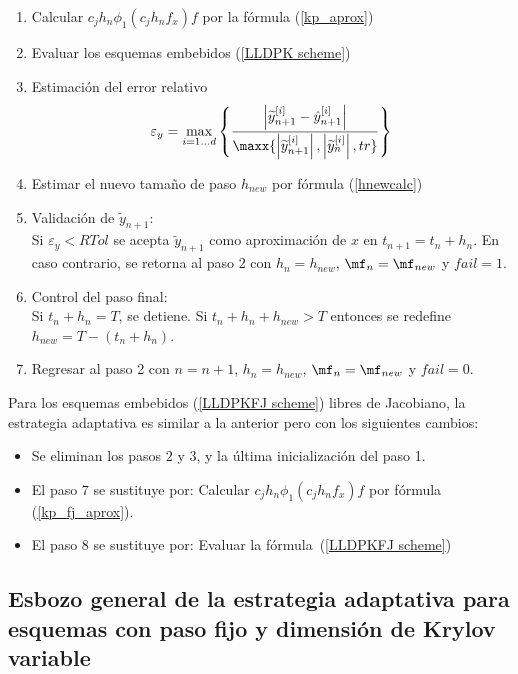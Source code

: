 \begin{enumerate}
    \item Calcular $c_jh_n\phi_1(c_jh_nf_x)f$ por la f\'ormula (\ref{kp_aprox})

    \item Evaluar los esquemas embebidos (\ref{LLDPK scheme})

    \item Estimaci\'on del error relativo
    \[ \varepsilon_y =  \max_{i=1\ldots d}\left\{ \frac{\left\lvert \widetilde{y}^{[i]}_{n+1}-\hat{y}^{[i]}_{n+1} \right\rvert}
    {\maxx{\left\lvert \widetilde{y}^{[i]}_{n+1}  \right\rvert,\left\lvert\widetilde{y}^{[i]}_{n}\right\rvert,tr}} \right\} \]

    \item Estimar el nuevo tama\~no de paso $h_{new}$ por fórmula (\ref{hnewcalc})   

    \item Validaci\'on  de $\widetilde{y}_{n+1}$:\\
    Si $\varepsilon_y<RTol$ se acepta $\widetilde{y}_{n+1}$ como aproximaci\'on de $x$ en $t_{n+1}=t_n+h_n$. En caso contrario, se retorna al paso 2 con $h_n=h_{new}$, $\mf_n = \mf_{new}$ y $fail = 1$.

    \item Control del paso final:\\
    Si $t_n+h_n=T$, se detiene. Si $t_n+h_n+h_{new}>T$ entonces se redefine $h_{new}=T-(t_n+h_n)$.

    \item Regresar al paso 2 con $n=n+1$, $h_n=h_{new}$, $\mf_n = \mf_{new}$ y $fail=0$.
    
\end{enumerate}
Para los esquemas embebidos (\ref{LLDPKFJ scheme}) libres de Jacobiano, la estrategia adaptativa es similar a la anterior pero con los siguientes cambios: \
\begin{itemize}
	\item Se eliminan los pasos $2$ y $3$, y la última inicialización del paso 1.
	\item El paso $7$ se sustituye por: Calcular $c_jh_n\phi_1(c_jh_nf_x)f$ por f\'ormula (\ref{kp_fj_aprox}).
	\item El paso $8$ se sustituye por: Evaluar la f\'ormula~(\ref{LLDPKFJ scheme})
\end{itemize}

\subsection{Esbozo general de la estrategia adaptativa para esquemas con paso fijo y dimensi\'on de Krylov variable}\label{adaptstratfix}

